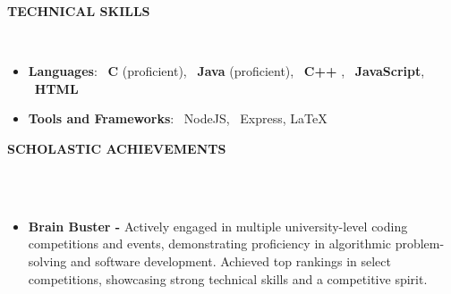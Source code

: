 \documentclass[a4paper,10pt]{article}
\newcommand{\lsep}{-0.5cm}
\newcommand{\resheading}[1]{{\small \colorbox{mygrey}{\begin{minipage}{0.975\textwidth}{\textbf{#1 \vphantom{p\^{E}}}}\end{minipage}}}}
\begin{document}
\resheading{\textbf{TECHNICAL SKILLS} }\\[\lsep]
\begin{itemize}
\setlength\itemsep{0em}
\item \noindent \textbf{Languages}: \  \textbf{C} (proficient), \  \textbf{Java} (proficient), \ \textbf{C++} , \ \textbf{JavaScript}, \   \textbf{HTML}\\
 \item \noindent\textbf{Tools and Frameworks}: \  NodeJS, \ Express, \LaTeX\\ 
\end{itemize}

\resheading{\textbf{SCHOLASTIC ACHIEVEMENTS} }\\[\lsep]
\\
\begin{itemize}
\setlength\itemsep{0em}
\item \noindent\textbf{Brain Buster - } Actively engaged in multiple university-level coding competitions and events, demonstrating proficiency in algorithmic problem-solving and software development. Achieved top rankings in select competitions, showcasing strong technical skills and a competitive spirit.
\end{itemize}
\end{document}
